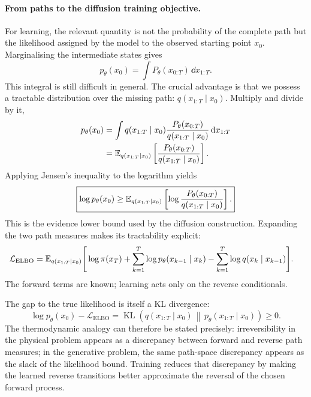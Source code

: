 \paragraph{From paths to the diffusion training objective.}

For learning, the relevant quantity is not the probability of the complete
path but the likelihood assigned by the model to the observed starting point
$x_0$. Marginalising the intermediate states gives
\begin{equation}
  p_\theta(x_0)
  =
  \int
  P_\theta(x_{0:T})
  \,\dd x_{1:T}.
  \label{eq:sm-model-marginal}
\end{equation}
This integral is still difficult in general. The crucial advantage is that we
possess a tractable distribution over the missing path:
$q(x_{1:T}\mid x_0)$. Multiply and divide by it,
\begin{align}
  p_\theta(x_0)
  &=
  \int
  q(x_{1:T}\mid x_0)
  \frac{
    P_\theta(x_{0:T})
  }{
    q(x_{1:T}\mid x_0)
  }
  \,\mathrm{d} x_{1:T}
  \nonumber\\
  &=
  \mathbb{E}_{q(x_{1:T}\mid x_0)}
  \left[
    \frac{
      P_\theta(x_{0:T})
    }{
      q(x_{1:T}\mid x_0)
    }
  \right].
  \label{eq:sm-importance-path}
\end{align}
Applying Jensen's inequality to the logarithm yields
\begin{equation}
  \boxed{
  \log p_\theta(x_0)
  \geq
  \mathbb{E}_{q(x_{1:T}\mid x_0)}
  \left[
    \log
    \frac{
      P_\theta(x_{0:T})
    }{
      q(x_{1:T}\mid x_0)
    }
  \right].
  }
  \label{eq:sm-elbo}
\end{equation}
This is the evidence lower bound used by the diffusion construction. Expanding
the two path measures makes its tractability explicit:
\begin{align}
  \mathcal L_{\mathrm{ELBO}}
  &=
  \mathbb{E}_{q(x_{1:T}\mid x_0)}
  \Bigg[
    \log\pi(x_T)
    +
    \sum_{k=1}^{T}
    \log p_\theta(x_{k-1}\mid x_k)
    -
    \sum_{k=1}^{T}
    \log q(x_k\mid x_{k-1})
  \Bigg].
  \label{eq:sm-elbo-expanded}
\end{align}
The forward terms are known; learning acts only on the reverse conditionals.

The gap to the true likelihood is itself a KL divergence:
\begin{equation}
  \log p_\theta(x_0)
  -
  \mathcal L_{\mathrm{ELBO}}
  =
  \operatorname{KL}\!\left(
    q(x_{1:T}\mid x_0)
    \,\middle\|\,
    p_\theta(x_{1:T}\mid x_0)
  \right)
  \geq0.
  \label{eq:sm-elbo-gap}
\end{equation}
The thermodynamic analogy can therefore be stated precisely: irreversibility in
the physical problem appears as a discrepancy between forward and reverse path
measures; in the generative problem, the same path-space discrepancy appears as
the slack of the likelihood bound. Training reduces that discrepancy by making
the learned reverse transitions better approximate the reversal of the chosen
forward process.


